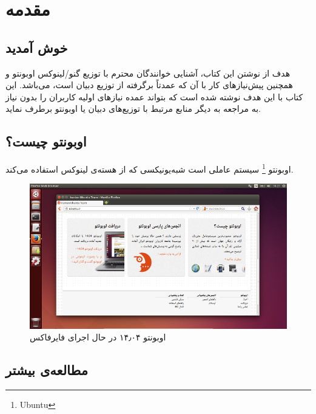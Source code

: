 \chapter{مقدمه}
\section{خوش آمدید}
هدف از نوشتن این کتاب، آشنایی خوانندگان محترم با توزیع گنو/لینوکس اوبونتو و همچنین پیش‌نیازهای کار با آن که عمدتاً برگرفته از توزیع دبیان است، می‌باشد. این کتاب با این هدف نوشته شده است که بتواند عمده نیازهای اولیه کاربران را بدون نیاز به مراجعه به دیگر منابع مرتبط با توزیع‌‌های دبیان یا اوبونتو برطرف نماید.
\section{اوبونتو چیست؟}
اوبونتو
\footnote{Ubuntu}
سیستم عاملی است شبه‌یونیکسی که از هسته‌ی لینوکس استفاده می‌کند.
\begin{figure}[hbtp]
\centering
\includegraphics[scale=0.5]{pics/ubuntu-14.04-firefox.png}
\caption{اوبونتو ۱۴٫۰۴ در حال اجرای فایرفاکس}
\label{fig:ubuntu-14.04-firefox}
\end{figure}

\section{مطالعه‌ی بیشتر}